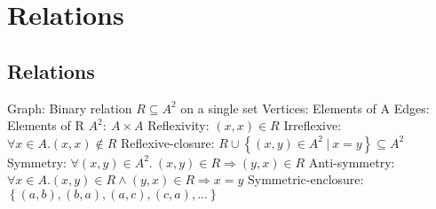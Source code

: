 \documentclass[12pt]{article}
\begin{document}
\section{Relations}
\subsection{Relations}
Graph: Binary relation \begin{math}R\subseteq A^{2}\end{math} on a single set\newline\newline
Vertices: Elements of A\newline\newline
Edges: Elements of R\newline\newline
\begin{math}A^{2}:\ A\times A\end{math}\newline\newline
Reflexivity: \begin{math}\left ( x,x \right )\in R\end{math}\newline\newline
Irreflexive: \begin{math}\forall x \in A. \left ( x,x \right )\notin R\end{math}\newline\newline
Reflexive-closure: \begin{math}R\cup \left \{ \left ( x,y \right )\in A^{2}\ |\ x=y \right \}\subseteq A^{2}\end{math}\newline\newline
Symmetry: \begin{math}\forall \left ( x,y \right )\in A^{2}. \ \left ( x,y \right )\in R \Rightarrow (y,x)\in R\end{math}\newline\newline
Anti-symmetry: \begin{math}\forall x \in A. \left ( x,y \right )\in R \wedge \left ( y,x \right )\in R \Rightarrow x=y\end{math}\newline\newline
Symmetric-enclosure: \begin{math}\left \{ \left ( a,b \right ), \left ( b,a \right ), \left ( a,c \right ), \left ( c,a \right ),... \right \}\end{math}\newline\newline
\end{document}
